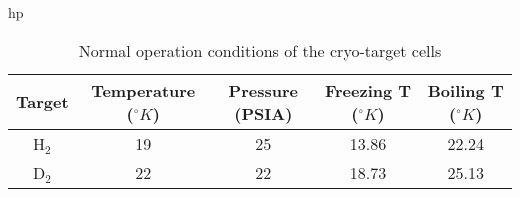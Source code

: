 \begin{table}{hp}
\begin{center}
\begin{tabular}{|c|c|c|c|c|}
\hline 
Target &
 Temperature (\( ^{\circ }K \))&
 Pressure (PSIA)&Freezing T (\( ^{\circ }K \))&Boiling T (\( ^{\circ }K \))\\
\hline 
H\( _{2} \)&
 19&
 25&13.86&22.24\\
\hline 
D\( _{2} \)&
 22&
 22&18.73&25.13\\
\hline 
\end{tabular}
\end{center}
\caption[Cryo-target: operation conditions]{Normal operation conditions
  of the cryo-target cells}
\label{tab:target-cryo-param}
\end{table}


